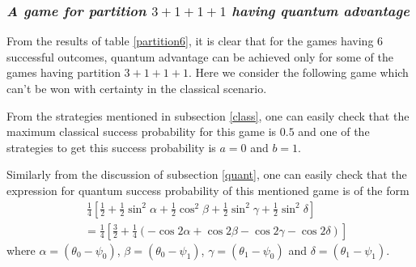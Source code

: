 \documentclass[]{svjour3}
\begin{document}
\subsubsection{\it A game for partition $3+1+1+1$ having quantum advantage}


From the results of table \ref{partition6}, it is clear that for the games having $6$ successful outcomes, quantum advantage can be achieved only for some of the games having partition $3+1+1+1$.
Here we consider the following game which can't be won with certainty in the classical scenario.

\begin{table}[htb]
	\begin{center}
		\setlength{\tabcolsep}{0.35em}
	\end{center}
\end{table}

From the strategies mentioned in subsection \ref{class}, one can easily check that the maximum classical success probability for this game is $0.5$ and one of the strategies to get this success probability is $a=0$ and $b=1$.

Similarly from the discussion of subsection \ref{quant}, one can easily check that the expression for quantum success probability of this mentioned game is of the form
\begin{align*}
~ &~ \frac{1}{4}\left[\frac{1}{2} + \frac{1}{2}\sin^2{\alpha} + \frac{1}{2} \cos^2 {\beta} + \frac{1}{2}\sin^2 {\gamma} + \frac{1}{2} \sin^2 {\delta}\right]\\
~ &= \frac{1}{4}\left[\frac{3}{2} + \frac{1}{4}(-\cos{2\alpha} + \cos{2\beta} - \cos{2\gamma} - \cos{2\delta})\right]
\end{align*}
where $\alpha=(\theta_0 - \psi_0)$, $\beta=(\theta_0 - \psi_1)$, $\gamma=(\theta_1 - \psi_0)$ and 
$\delta=(\theta_1 - \psi_1)$. 
\end{document}

